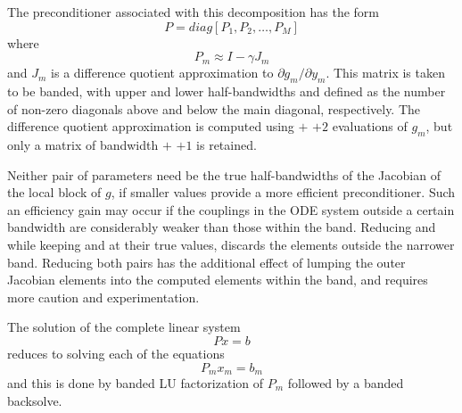 The preconditioner associated with this decomposition has the form 
\begin{equation}
  P= diag[P_1, P_2, \ldots, P_M]
\end{equation}
where 
\begin{equation}
  P_m \approx I - \gamma J_m
\end{equation}
and $J_m$ is a difference quotient approximation to 
$\partial g_m/\partial y_m$. This matrix is taken to be banded, with
upper and lower half-bandwidths  and  defined as
the number of non-zero diagonals above and below the main diagonal,
respectively. The difference quotient approximation is computed using
 $+$  $+ 2$ evaluations of $g_m$, but only a matrix
of bandwidth  $+$  $+ 1$ is retained.

Neither pair of parameters need be the true half-bandwidths of the Jacobian
of the local block of $g$, if smaller values provide a more efficient
preconditioner.  Such an efficiency gain may occur if the couplings
in the ODE system outside a certain bandwidth are considerably weaker than
those within the band.  Reducing  and  while keeping
 and  at their true values, discards the elements
outside the narrower band.  Reducing both pairs has the additional
effect of lumping the outer Jacobian elements into the computed elements
within the band, and requires more caution and experimentation.

The solution of the complete linear system
\begin{equation}
  Px = b
\end{equation}
reduces to solving each of the equations 
\begin{equation}
  P_m x_m = b_m
\end{equation}
and this is done by banded LU factorization of $P_m$ followed by a banded
backsolve.

